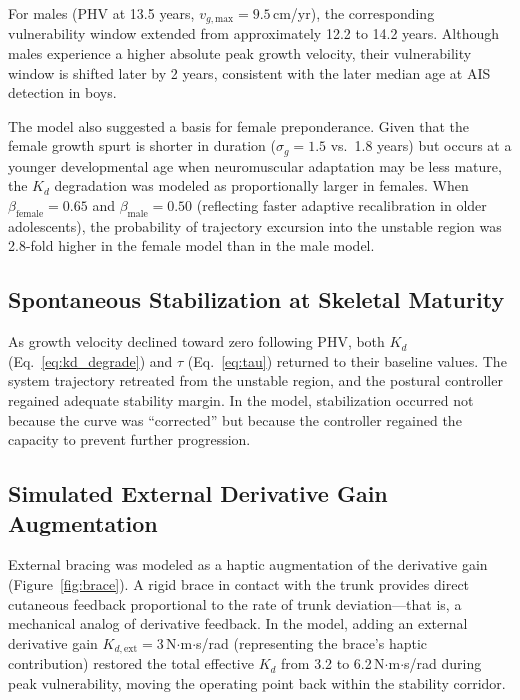 \documentclass[12pt,a4paper]{article}
\begin{document}
For males (PHV at 13.5 years, $v_{g,\text{max}} = 9.5$\,cm/yr), the corresponding vulnerability window extended from approximately 12.2 to 14.2 years. Although males experience a higher absolute peak growth velocity, their vulnerability window is shifted later by 2 years, consistent with the later median age at AIS detection in boys.

The model also suggested a basis for female preponderance. Given that the female growth spurt is shorter in duration ($\sigma_g = 1.5$ vs.\ 1.8 years) but occurs at a younger developmental age when neuromuscular adaptation may be less mature, the $K_d$ degradation was modeled as proportionally larger in females. When $\beta_{\text{female}} = 0.65$ and $\beta_{\text{male}} = 0.50$ (reflecting faster adaptive recalibration in older adolescents), the probability of trajectory excursion into the unstable region was 2.8-fold higher in the female model than in the male model.

\subsection{Spontaneous Stabilization at Skeletal Maturity}

As growth velocity declined toward zero following PHV, both $K_d$ (Eq.~\ref{eq:kd_degrade}) and $\tau$ (Eq.~\ref{eq:tau}) returned to their baseline values. The system trajectory retreated from the unstable region, and the postural controller regained adequate stability margin. In the model, stabilization occurred not because the curve was ``corrected'' but because the controller regained the capacity to prevent further progression.

\subsection{Simulated External Derivative Gain Augmentation}

External bracing was modeled as a haptic augmentation of the derivative gain (Figure~\ref{fig:brace}). A rigid brace in contact with the trunk provides direct cutaneous feedback proportional to the rate of trunk deviation---that is, a mechanical analog of derivative feedback. In the model, adding an external derivative gain $K_{d,\text{ext}} = 3$\,N$\cdot$m$\cdot$s/rad (representing the brace's haptic contribution) restored the total effective $K_d$ from 3.2 to 6.2\,N$\cdot$m$\cdot$s/rad during peak vulnerability, moving the operating point back within the stability corridor.
\end{document}
